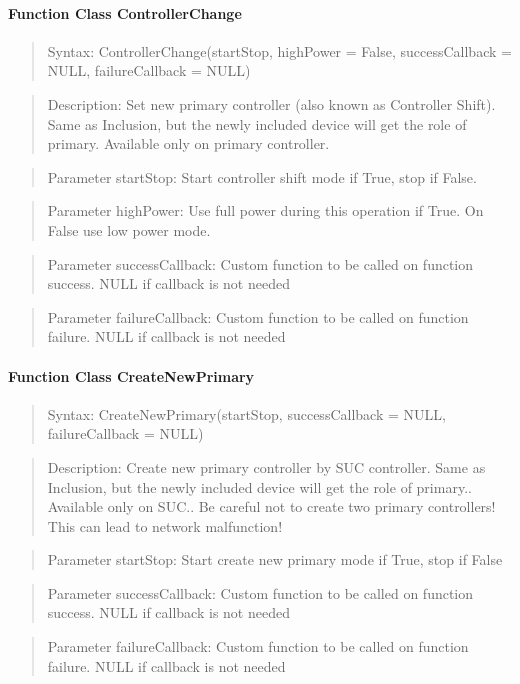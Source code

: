 \paragraph {Function Class ControllerChange}
\begin{quote} Syntax: ControllerChange(startStop, highPower = False, successCallback = NULL, failureCallback = NULL)\end{quote}
\begin{quote} Description: Set new primary controller (also known as Controller Shift). Same as Inclusion, but the newly included device will get the role of primary. Available only on primary controller.\end{quote}
\begin{quote} Parameter startStop: Start controller shift mode if True, stop if False.\end{quote}
\begin{quote} Parameter highPower: Use full power during this operation if True. On False use low power mode.\end{quote}
\begin{quote} Parameter successCallback: Custom function to be called on function success. NULL if callback is not needed\end{quote} 
\begin{quote} Parameter failureCallback: Custom function to be called on function failure. NULL if callback is not needed\end{quote} 

\paragraph {Function Class CreateNewPrimary}
\begin{quote} Syntax: CreateNewPrimary(startStop, successCallback = NULL, failureCallback = NULL)\end{quote}
\begin{quote} Description: Create new primary controller by SUC controller. Same as Inclusion, but the newly included device will get the role of primary.. Available only on SUC.. Be careful not to create two primary controllers! This can lead to network malfunction!\end{quote}
\begin{quote} Parameter startStop: Start create new primary mode if True, stop if False\end{quote}
\begin{quote} Parameter successCallback: Custom function to be called on function success. NULL if callback is not needed\end{quote} 
\begin{quote} Parameter failureCallback: Custom function to be called on function failure. NULL if callback is not needed\end{quote} 

